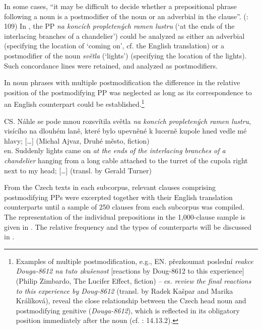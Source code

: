 \documentclass[output=paper]{langscibook}
\begin{document}
In some cases, “it may be difficult to decide whether a prepositional phrase following a noun is a postmodifier of the noun or an adverbial in the clause”. (\citealt{BiberEtAl2021}: 109) In , the PP \textit{na koncích propletených ramen lustru} (‘at the ends of the interlacing branches of a chandelier’) could be analyzed as either an adverbial (specifying the location of ‘coming on’, cf. the English translation) or a postmodifier of the noun \textit{světla} (‘lights’) (specifying the location of the lights). Such concordance lines were retained, and analyzed as postmodifiers.

In noun phrases with multiple postmodification the difference in the relative position of the postmodifying PP was neglected as long as its correspondence to an English counterpart could be established.\footnote{Examples of multiple postmodification, e.g., EN. přezkoumat poslední \textit{reakce Douga-8612 na tuto zkušenost} [reactions by Doug-8612 to this experience] (Philip Zimbardo, The Lucifer Effect, fiction) – cs. \textit{review the final reactions to this experience by Doug-8612} (transl. by Radek Kašpar and Marika Králíková), reveal the close relationship between the Czech head noun and postmodifying genitive (\textit{Douga-8612}), which is reflected in its obligatory position immediately after the noun (cf. \citealt{DuškováEtAl2009}: 14.13.2).}

\ea\label{ex:mala:5} CS. Náhle se pode mnou rozsvítila světla \textit{na koncích propletených ramen lustru}, visícího na dlouhém laně, které bylo upevněné k lucerně kupole hned vedle mé hlavy; […] (Michal Ajvaz, Druhé město, fiction) \\
en. Suddenly lights came on \textit{at the ends of the interlacing branches of a chandelier} hanging from a long cable attached to the turret of the cupola right next to my head; […] (transl. by Gerald Turner)
\z

From the Czech texts in each subcorpus, relevant clauses comprising postmodifying PPs were excerpted together with their English translation counterparts until a sample of 250 clauses from each subcorpus was compiled. The representation of the individual prepositions in the 1,000-clause sample is given in . The relative frequency and the types of counterparts will be discussed in .
\end{document}
